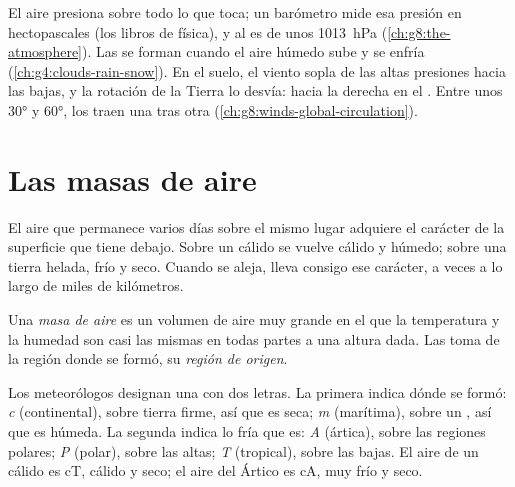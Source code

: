 \begin{recall}
El aire presiona sobre todo lo que toca; un barómetro mide esa presión en
hectopascales (los libros de física), y al  es de unos
\qty{1013}{hPa} (\cref{ch:g8:the-atmosphere}). Las  se forman cuando
el aire húmedo sube y se enfría (\cref{ch:g4:clouds-rain-snow}). En el
suelo, el viento sopla de las altas presiones hacia las bajas, y la
rotación de la Tierra lo desvía: hacia la derecha en el .
Entre unos \ang{30} y \ang{60}, los  traen una 
tras otra (\cref{ch:g8:winds-global-circulation}).
\end{recall}

\section{Las masas de aire}

El aire que permanece varios días sobre el mismo lugar adquiere el carácter
de la superficie que tiene debajo. Sobre un  cálido se vuelve cálido
y húmedo; sobre una tierra helada, frío y seco. Cuando se aleja, lleva
consigo ese carácter, a veces a lo largo de miles de kilómetros.

\begin{definition}\label{def:g8:fronts-and-weather-maps:air-mass}
Una \emph{masa de aire} es un volumen de aire muy
grande en el que la temperatura y la humedad son casi las mismas en todas
partes a una altura dada. Las toma de la región donde se formó, su
\emph{región de origen}.
\end{definition}

Los meteorólogos designan una  con dos letras. La primera
indica dónde se formó: \emph{c} (continental), sobre tierra firme, así que
es seca; \emph{m} (marítima), sobre un , así que es húmeda. La
segunda indica lo fría que es: \emph{A} (ártica), sobre las regiones
polares; \emph{P} (polar), sobre las  altas; \emph{T} (tropical),
sobre las  bajas. El aire de un  cálido es cT, cálido y
seco; el aire del Ártico es cA, muy frío y seco.

